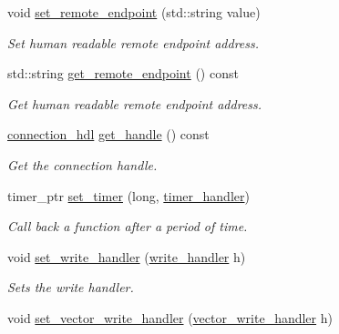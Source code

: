 \begin{DoxyCompactItemize}
void \mbox{\hyperlink{classwebsocketpp_1_1transport_1_1iostream_1_1connection_a846340a41ebbce1a6a1cecfd9026c2e9}{set\+\_\+remote\+\_\+endpoint}} (std\+::string value)
\begin{DoxyCompactList}\small\item\em Set human readable remote endpoint address. \end{DoxyCompactList}\item 
std\+::string \mbox{\hyperlink{classwebsocketpp_1_1transport_1_1iostream_1_1connection_ac1c63528e36a2a60c0efc01a1c17584e}{get\+\_\+remote\+\_\+endpoint}} () const
\begin{DoxyCompactList}\small\item\em Get human readable remote endpoint address. \end{DoxyCompactList}\item 
\mbox{\hyperlink{namespacewebsocketpp_a6b3d26a10ee7229b84b776786332631d}{connection\+\_\+hdl}} \mbox{\hyperlink{classwebsocketpp_1_1transport_1_1iostream_1_1connection_a06d23eee9c6c1bd1a48f7cf8a081bda9}{get\+\_\+handle}} () const
\begin{DoxyCompactList}\small\item\em Get the connection handle. \end{DoxyCompactList}\item 
timer\+\_\+ptr \mbox{\hyperlink{classwebsocketpp_1_1transport_1_1iostream_1_1connection_a7852f9c0dc64d6e51b57b4a28302a602}{set\+\_\+timer}} (long, \mbox{\hyperlink{namespacewebsocketpp_1_1transport_a946cc56ff41139f3002149c15fd87bc9}{timer\+\_\+handler}})
\begin{DoxyCompactList}\small\item\em Call back a function after a period of time. \end{DoxyCompactList}\item 
void \mbox{\hyperlink{classwebsocketpp_1_1transport_1_1iostream_1_1connection_a32740c33406e5484da7f030fb106ae22}{set\+\_\+write\+\_\+handler}} (\mbox{\hyperlink{namespacewebsocketpp_1_1transport_1_1iostream_abc22b834c2d0c698d6c87e51d5bfad2c}{write\+\_\+handler}} h)
\begin{DoxyCompactList}\small\item\em Sets the write handler. \end{DoxyCompactList}\item 
void \mbox{\hyperlink{classwebsocketpp_1_1transport_1_1iostream_1_1connection_aa035dc6275c5babb99c0cbada8521b5c}{set\+\_\+vector\+\_\+write\+\_\+handler}} (\mbox{\hyperlink{namespacewebsocketpp_1_1transport_1_1iostream_a21982146513c0b5580786c3af5dd2878}{vector\+\_\+write\+\_\+handler}} h)

\end{DoxyCompactItemize}
